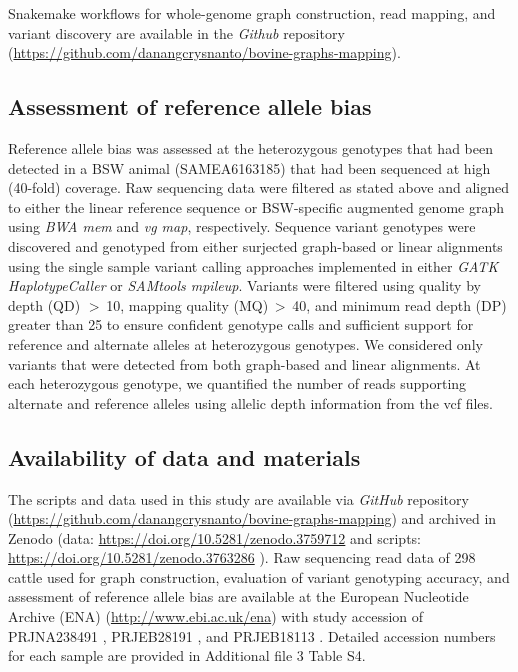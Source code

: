 \documentclass[../main.tex]{subfiles}
\begin{document}
Snakemake workflows \citep{koster2012snakemake} for whole-genome graph construction, read mapping, and variant discovery are available in the \emph{Github} repository (\url{https://github.com/danangcrysnanto/bovine-graphs-mapping}).

\subsection*{Assessment of reference allele bias}

Reference allele bias was assessed at the heterozygous genotypes that had been detected in a BSW animal (SAMEA6163185) that had been sequenced at high (40-fold) coverage. Raw sequencing data were filtered as stated above and aligned to either the linear reference sequence or BSW-specific augmented genome graph using \emph{BWA mem} and \emph{vg map}, respectively. Sequence variant genotypes were discovered and genotyped from either surjected graph-based or linear alignments using the single sample variant calling approaches implemented in either \emph{GATK HaplotypeCaller} or \emph{SAMtools mpileup}. Variants were filtered using quality by depth (QD) $>$ 10, mapping quality (MQ) $>$ 40, and minimum read depth (DP) greater than 25 to ensure confident genotype calls and sufficient support for reference and alternate alleles at heterozygous genotypes. We considered only variants that were detected from both graph-based and linear alignments. At each heterozygous genotype, we quantified the number of reads supporting alternate and reference alleles using allelic depth information from the vcf files.

\subsection*{Availability of data and materials}

The scripts and data used in this study are available via \emph{GitHub} repository (\url{https://github.com/danangcrysnanto/bovine-graphs-mapping}) and archived in Zenodo (data: \url{https://doi.org/10.5281/zenodo.3759712} \citep{Crysnanto2020data} and scripts: \url{https://doi.org/10.5281/zenodo.3763286} \citep{Crysnanto2020script}). Raw sequencing read data of 298 cattle used for graph construction, evaluation of variant genotyping accuracy, and assessment of reference allele bias are available at the European Nucleotide Archive (ENA) (\url{http://www.ebi.ac.uk/ena}) with study accession of PRJNA238491 \citep{daetwyler2014whole}, PRJEB28191 \citep{crysnanto2019accurate}, and PRJEB18113 \citep{hofstetter2019non}. Detailed accession numbers for each sample are provided in Additional file 3 Table S4.










\singlespacing
\footnotesize




\ifdefined\BuildingFromMainFile
\else
   
\end{document}
